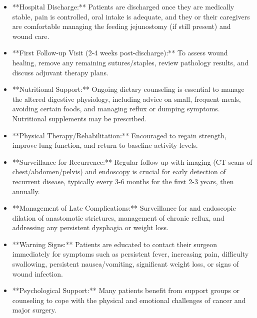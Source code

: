 \begin{itemize}
  \item **Hospital Discharge:** Patients are discharged once they are medically stable, pain is controlled, oral intake is adequate, and they or their caregivers are comfortable managing the feeding jejunostomy (if still present) and wound care.
  \item **First Follow-up Visit (2-4 weeks post-discharge):** To assess wound healing, remove any remaining sutures/staples, review pathology results, and discuss adjuvant therapy plans.
  \item **Nutritional Support:** Ongoing dietary counseling is essential to manage the altered digestive physiology, including advice on small, frequent meals, avoiding certain foods, and managing reflux or dumping symptoms. Nutritional supplements may be prescribed.
  \item **Physical Therapy/Rehabilitation:** Encouraged to regain strength, improve lung function, and return to baseline activity levels.
  \item **Surveillance for Recurrence:** Regular follow-up with imaging (CT scans of chest/abdomen/pelvis) and endoscopy is crucial for early detection of recurrent disease, typically every 3-6 months for the first 2-3 years, then annually.
  \item **Management of Late Complications:** Surveillance for and endoscopic dilation of anastomotic strictures, management of chronic reflux, and addressing any persistent dysphagia or weight loss.
  \item **Warning Signs:** Patients are educated to contact their surgeon immediately for symptoms such as persistent fever, increasing pain, difficulty swallowing, persistent nausea/vomiting, significant weight loss, or signs of wound infection.
  \item **Psychological Support:** Many patients benefit from support groups or counseling to cope with the physical and emotional challenges of cancer and major surgery.
\end{itemize}

